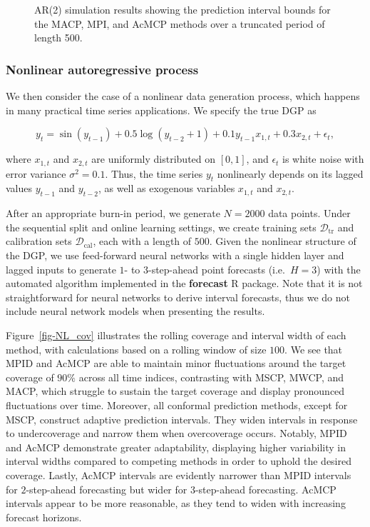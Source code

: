 \documentclass[
  11pt,
  a4paper,
]{article}
\theoremstyle{plain}
\theoremstyle{remark}
\begin{document}
\begin{figure}


\caption{\label{fig-AR2_timeplot}AR(2) simulation results showing the
prediction interval bounds for the MACP, MPI, and AcMCP methods over a
truncated period of length 500.}

\end{figure}%

\subsubsection{Nonlinear autoregressive
process}\label{nonlinear-autoregressive-process}

We then consider the case of a nonlinear data generation process, which
happens in many practical time series applications. We specify the true
DGP as

\[
y_t = \sin(y_{t-1}) + 0.5\log(y_{t-2} + 1) + 0.1y_{t-1}x_{1,t} + 0.3x_{2,t} + \epsilon_{t},
\]

where \(x_{1,t}\) and \(x_{2,t}\) are uniformly distributed on
\([0,1]\), and \(\epsilon_{t}\) is white noise with error variance
\(\sigma^2 = 0.1\). Thus, the time series \(y_t\) nonlinearly depends on
its lagged values \(y_{t-1}\) and \(y_{t-2}\), as well as exogenous
variables \(x_{1,t}\) and \(x_{2,t}\).

After an appropriate burn-in period, we generate \(N=2000\) data points.
Under the sequential split and online learning settings, we create
training sets \(\mathcal{D}_{\text{tr}}\) and calibration sets
\(\mathcal{D}_{\text{cal}}\), each with a length of \(500\). Given the
nonlinear structure of the DGP, we use feed-forward neural networks with
a single hidden layer and lagged inputs to generate \(1\)- to
\(3\)-step-ahead point forecasts (i.e.~\(H=3\)) with the automated
algorithm implemented in the \textbf{forecast} R package. Note that it
is not straightforward for neural networks to derive interval forecasts,
thus we do not include neural network models when presenting the
results.

Figure~\ref{fig-NL_cov} illustrates the rolling coverage and interval
width of each method, with calculations based on a rolling window of
size \(100\). We see that MPID and AcMCP are able to maintain minor
fluctuations around the target coverage of \(90\%\) across all time
indices, contrasting with MSCP, MWCP, and MACP, which struggle to
sustain the target coverage and display pronounced fluctuations over
time. Moreover, all conformal prediction methods, except for MSCP,
construct adaptive prediction intervals. They widen intervals in
response to undercoverage and narrow them when overcoverage occurs.
Notably, MPID and AcMCP demonstrate greater adaptability, displaying
higher variability in interval widths compared to competing methods in
order to uphold the desired coverage. Lastly, AcMCP intervals are
evidently narrower than MPID intervals for \(2\)-step-ahead forecasting
but wider for \(3\)-step-ahead forecasting. AcMCP intervals appear to be
more reasonable, as they tend to widen with increasing forecast
horizons.
\end{document}
